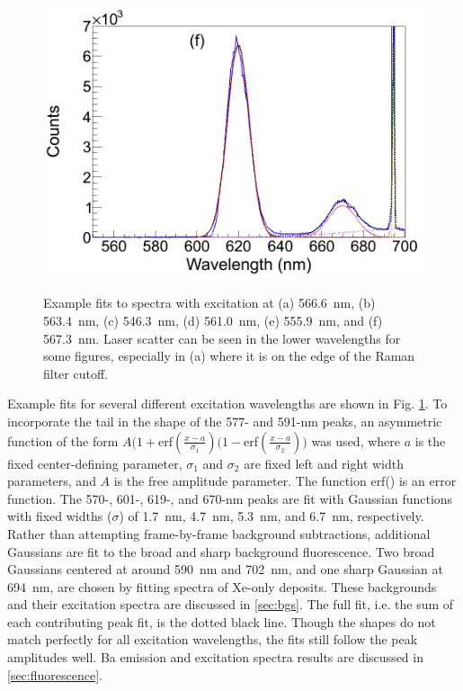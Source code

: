 \begin{figure}
                ~
                \includegraphics[width=.5\textwidth]{figures/spectra_fit_f.png}
                \caption{Example fits to spectra with excitation at (a) 566.6~nm, (b) 563.4~nm, (c) 546.3~nm, (d) 561.0~nm, (e) 555.9~nm, and (f) 567.3~nm.  Laser scatter can be seen in the lower wavelengths for some figures, especially in (a) where it is on the edge of the Raman filter cutoff.}
\label{fig:specFitsGrn}
\end{figure}

Example fits for several different excitation wavelengths are shown in Fig. \ref{fig:specFitsGrn}.  To incorporate the tail in the shape of the 577- and 591-nm peaks, an asymmetric function of the form $A(1+$erf$(\frac{x-a}{\sigma_{1}})(1-$erf$(\frac{x-a}{\sigma_{2}}))$ was used, where $a$ is the fixed center-defining parameter, $\sigma_{1}$ and $\sigma_{2}$ are fixed left and right width parameters, and $A$ is the free amplitude parameter.  The function erf() is an error function.  The 570-, 601-, 619-, and 670-nm peaks are fit with Gaussian functions with fixed widths ($\sigma$) of 1.7~nm, 4.7~nm, 5.3~nm, and 6.7~nm, respectively.  Rather than attempting frame-by-frame background subtractions, additional Gaussians are fit to the broad and sharp background fluorescence.  Two broad Gaussians centered at around 590~nm and 702~nm, and one sharp Gaussian at 694~nm, are chosen by fitting spectra of Xe-only deposits.  These backgrounds and their excitation spectra are discussed in \ref{sec:bgs}.  The full fit, i.e. the sum of each contributing peak fit, is the dotted black line.  Though the shapes do not match perfectly for all excitation wavelengths, the fits still follow the peak amplitudes well.  Ba emission and excitation spectra results are discussed in \ref{sec:fluorescence}.



